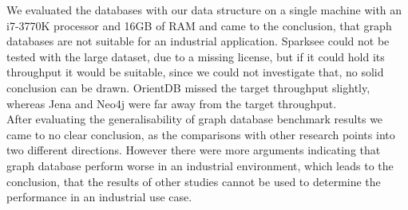 We evaluated the databases with our data structure on a single machine with an i7-3770K processor and 16GB of RAM and came to the conclusion,
that graph databases are not suitable for an industrial application.
Sparksee could not be tested with the large dataset,
due to a missing license,
but if it could hold its throughput it would be suitable,
since we could not investigate that,
no solid conclusion can be drawn.
OrientDB missed the target throughput slightly,
whereas Jena and Neo4j were far away from the target throughput.\\
After evaluating the generalisability of graph database benchmark results we came to no clear conclusion,
as the comparisons with other research points into two different directions.
However there were more arguments indicating that graph database perform worse in an industrial environment,
which leads to the conclusion,
that the results of other studies cannot be used to determine the performance in an industrial use case.

\cleardoublepage

